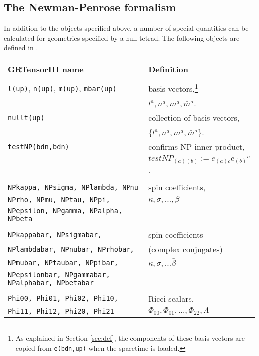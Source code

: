 \documentclass{article}
\begin{document}
\subsection*{The Newman-Penrose formalism}\label{sec:NP}
%
In addition to the objects specified above, a number of special
quantities can be calculated for geometries specified by a null
tetrad. The following objects are defined in
\cite{newman/penrose:1962}.\\

\begin{longtable}[c]{p{}p{}}\hline\hline
GRTensorIII name & Definition\\ \hline
& \\
\texttt{l(up)}, \texttt{n(up)}, \texttt{m(up)}, \texttt{mbar(up)}
				& basis vectors,\footnote{As explained
				in Section \ref{sec:def}, the components
				of these basis vectors are copied from
				\texttt{e(bdn,up)} when the spacetime is
				loaded.}\\
				& $l^a, n^a, m^a, \bar{m}^a$. \\
\texttt{nullt(up)}			& collection of basis vectors, \\
				& $\{ l^a, n^a, m^a, \bar{m}^a \}$. \\
\texttt{testNP(bdn,bdn)}	& confirms NP inner product, \\
				& $testNP_{(a)(b)} := e_{(a)c}e_{(b)}{}^c$.\\
& \\
\texttt{NPkappa, NPsigma, NPlambda, NPnu} & spin coefficients, \\
\texttt{NPrho, NPmu, NPtau, NPpi,} & $\kappa, \sigma, \ldots, \beta$\\
\texttt{NPepsilon, NPgamma, NPalpha, NPbeta} & \\
& \\
\texttt{NPkappabar, NPsigmabar,} & spin coefficients\\
\texttt{NPlambdabar, NPnubar, NPrhobar,} & (complex conjugates) \\
\texttt{NPmubar, NPtaubar, NPpibar,} & $\bar{\kappa}, \bar{\sigma},
				\ldots \bar{\beta}$ \\
\texttt{NPepsilonbar, NPgammabar, NPalphabar, NPbetabar} & \\
& \\
\texttt{Phi00, Phi01, Phi02, Phi10,} & Ricci scalars, \\
\texttt{Phi11, Phi12, Phi20, Phi21}  & $\Phi_{00}, \Phi_{01}, \ldots,
				  \Phi_{22}, \Lambda$ \\

\end{longtable}
\end{document}
